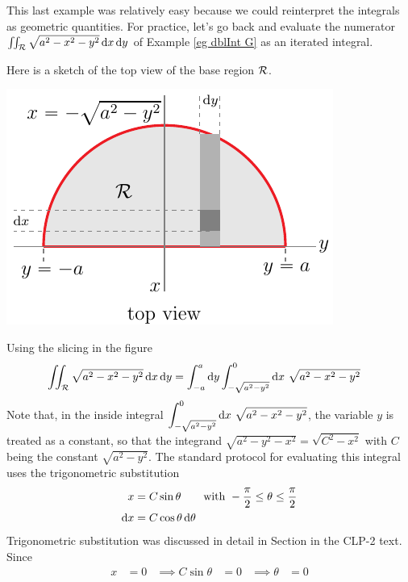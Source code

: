 \begin{eg}\label{eg dblInt H}
This last example was relatively easy because we could reinterpret the integrals
as geometric quantities. For practice, let's go back and 
evaluate the numerator
$\iint_{\mathcal{R}} \sqrt{a^2-x^2-y^2}\,\mathrm{d}x\,\mathrm{d}y$ of
Example \ref{eg dblInt G} as an iterated integral.

Here is a sketch of the top view of the base region $\mathcal{R}$.
\begin{efig}
\begin{center}
   \includegraphics{halfDomeB.pdf}
\end{center}
\end{efig}
Using the slicing in the figure
\begin{align*}
\dblInt_\cR \sqrt{a^2-x^2-y^2}\,\dee{x}\,\dee{y}
&= \int_{-a}^a \dee{y} \int_{-\sqrt{a^2-y^2}}^0\dee{x}\ 
             \sqrt{a^2-x^2-y^2}
\end{align*}
Note that, in the inside integral 
$\displaystyle \int_{-\sqrt{a^2-y^2}}^0\dee{x}\ 
             \sqrt{a^2-x^2-y^2}$,
the variable $y$ is treated as a constant, so that the integrand
$
\sqrt{a^2-y^2-x^2} = \sqrt{C^2-x^2}
$
with $C$ being the constant $\sqrt{a^2-y^2}$. The standard protocol
for evaluating this integral uses the trigonometric substitution
\begin{align*}
x &= C\sin\theta\qquad\text{with } -\frac{\pi}{2}\le\theta\le\frac{\pi}{2} \\
\mathrm{d}x &= C\cos\theta\,\mathrm{d}\theta
\end{align*}
Trigonometric substitution was discussed in detail in 
Section  in the CLP-2 text.
Since
\begin{align*}
x&=0 & \implies C\sin\theta&=0 &\implies \theta&=0 \\

\end{align*}
\end{eg}
